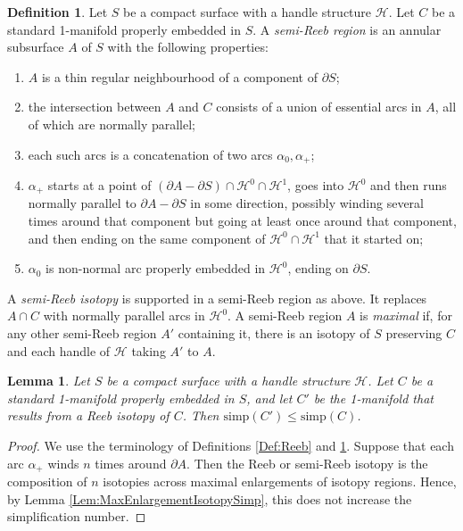 \documentclass[oneside]{amsart}
\numberwithin{equation}{section}
\theoremstyle{plain}
\newtheorem{lemma}[equation]{Lemma}
\theoremstyle{definition}
\newtheorem{definition}[equation]{Definition}
\newcommand{\calH}{\mathcal{H}}
\begin{document}
\begin{definition}
\label{Def:SemiReeb}
Let $S$ be a compact surface with a handle structure $\calH$. Let $C$ be a standard 1-manifold properly embedded in $S$. A \emph{semi-Reeb region} is an annular subsurface $A$ of $S$ with the following
properties:
\begin{enumerate}
\item $A$ is a thin regular neighbourhood of a component of $\partial S$;
\item the intersection between $A$ and $C$ consists of a union of essential arcs in $A$, all of which are normally parallel;
\item each such arcs is a concatenation of two arcs $\alpha_0, \alpha_+$;
\item $\alpha_+$ starts at a point of $(\partial A - \partial S) \cap \calH^0 \cap \calH^1$, goes into $\calH^0$ and then runs normally parallel to $\partial A - \partial S$ in some direction, possibly winding several times around that component but going at least once around that component, and then ending on the same component of $\calH^0 \cap \calH^1$ that it started on;
\item $\alpha_0$ is non-normal arc properly embedded in $\calH^0$, ending on $\partial S$.
\end{enumerate}
A \emph{semi-Reeb isotopy} is supported in a semi-Reeb region as above. It replaces $A \cap C$ with normally parallel arcs in $\calH^0$. A semi-Reeb region $A$ is \emph{maximal} if, for any other semi-Reeb region $A'$ containing it, there is an isotopy of $S$ preserving $C$ and each handle of $\calH$ taking $A'$ to $A$.
\end{definition}

\begin{lemma}
Let $S$ be a compact surface with a handle structure $\calH$. Let $C$ be a standard 1-manifold properly embedded in $S$, and let $C'$ be the 1-manifold that results from a Reeb isotopy of $C$. Then $\mathrm{simp}(C') \leq \mathrm{simp}(C)$.
\end{lemma}

\begin{proof} 
We use the terminology of Definitions \ref{Def:Reeb} and \ref{Def:SemiReeb}. Suppose that each arc $\alpha_+$ winds $n$ times around $\partial A$. Then the Reeb or semi-Reeb isotopy is the composition of $n$ isotopies across maximal enlargements of isotopy regions. Hence, by Lemma \ref{Lem:MaxEnlargementIsotopySimp}, this does not increase the simplification number.
\end{proof}
\end{document}
